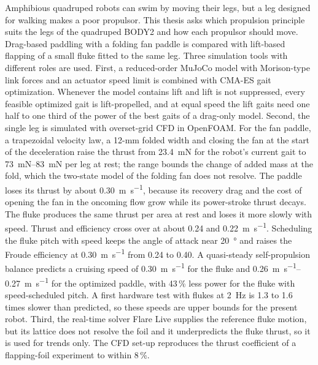 \vspace{12mm}
\vspace{6mm}
\noindent
Amphibious quadruped robots can swim by moving their legs, but a leg designed for walking makes a poor
propulsor. This thesis asks which propulsion principle suits the legs of the quadruped BODY2 and how each
propulsor should move. Drag-based paddling with a folding fan paddle is compared with lift-based flapping of a
small fluke fitted to the same leg. Three simulation tools with different roles are used. First, a reduced-order
MuJoCo model with Morison-type link forces and an actuator speed limit is combined with CMA-ES gait
optimization. Whenever the model contains lift and lift is not suppressed, every feasible optimized gait is lift-propelled, and at equal speed the lift gaits
need one half to one third of the power of the best gaits of a drag-only model. Second, the single leg is simulated
with overset-grid CFD in OpenFOAM. For the fan paddle, a trapezoidal velocity law, a 12-mm folded width and
closing the fan at the start of the deceleration raise the thrust from \SI{23.4}{\milli\newton} for the robot's
current gait to \SIrange{73}{83}{\milli\newton} per leg at rest; the range bounds the change of added mass at the
fold, which the two-state model of the folding fan does not resolve. The paddle loses its thrust by about
\SI{0.30}{\metre\per\second}, because its recovery drag and the cost of opening the fan in the oncoming flow grow
while its power-stroke thrust decays. The fluke produces the same thrust per area at rest and loses it more slowly with speed.
Thrust and efficiency cross over at about \SI{0.24}{} and \SI{0.22}{\metre\per\second}. Scheduling the fluke pitch with speed keeps the angle of attack near
\SI{20}{\degree} and raises the Froude efficiency at \SI{0.30}{\metre\per\second} from 0.24 to 0.40. A
quasi-steady self-propulsion balance predicts a cruising speed of \SI{0.30}{\metre\per\second} for the fluke and
\SIrange{0.26}{0.27}{\metre\per\second} for the optimized paddle, with 43\,\% less power for the fluke with
speed-scheduled pitch. A first hardware test with flukes at \SI{2}{\hertz} is 1.3 to 1.6 times slower than predicted, so these
speeds are upper bounds for the present robot. Third, the real-time solver Flare Live supplies the reference fluke motion, but its lattice does not resolve the
foil and it underpredicts the fluke thrust, so it is used for trends only. The CFD set-up
reproduces the thrust coefficient of a flapping-foil experiment to within 8\,\%.
\cleardoublepage
